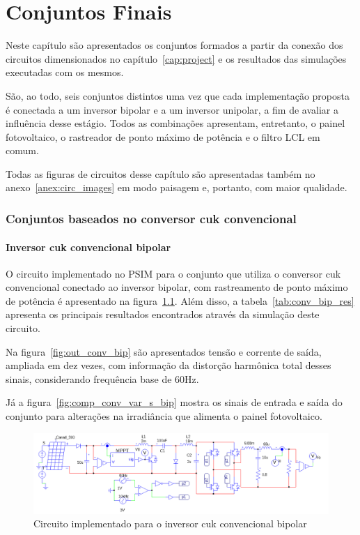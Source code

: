 \documentclass[
	12pt,				%
	openany,
	onseside,
	a4paper,			%
	english,			%
	french,				%
	spanish,			%
	brazil,				%
	]{abntex2}
\begin{document}
\chapter{Conjuntos Finais}

Neste capítulo são apresentados os conjuntos formados a partir da conexão dos circuitos dimensionados no capítulo~\ref{cap:project} e os resultados das simulações executadas com os mesmos.

São, ao todo, seis conjuntos distintos uma vez que cada implementação proposta é conectada a um inversor bipolar e a um inversor unipolar, a fim de avaliar a influência desse estágio. Todos as combinações apresentam, entretanto, o painel fotovoltaico, o rastreador de ponto máximo de potência e o filtro LCL em comum.

Todas as figuras de circuitos desse capítulo são apresentadas também no anexo~\ref{anex:circ_images} em modo paisagem e, portanto, com maior qualidade.

\subsection{Conjuntos baseados no conversor cuk convencional}
\subsubsection{Inversor cuk convencional bipolar}

O circuito implementado no PSIM para o conjunto que utiliza o conversor cuk convencional conectado ao inversor bipolar, com rastreamento de ponto máximo de potência é apresentado na figura~\ref{fig:comp_conv_circ_clean}. Além disso, a tabela~\ref{tab:conv_bip_res} apresenta os principais resultados encontrados através da simulação deste circuito.

Na figura~\ref{fig:out_conv_bip} são apresentados tensão e corrente de saída, ampliada em dez vezes, com informação da distorção harmônica total desses sinais, considerando frequência base de 60Hz.

Já a figura~\ref{fig:comp_conv_var_s_bip} mostra os sinais de entrada e saída do conjunto para alterações na irradiância que alimenta o painel fotovoltaico.

\begin{figure}[H]%
	\captionsetup{justification=centering}
	\centering
		\includegraphics[width= \linewidth]{comp_conv_circ_clean}
		\caption{Circuito implementado para o inversor cuk convencional bipolar}
		\label{fig:comp_conv_circ_clean}
\end{figure}
\end{document}
